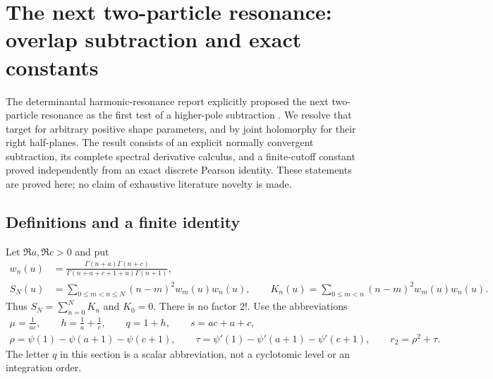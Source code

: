 \section{The next two-particle resonance: overlap subtraction and exact constants}
\label{sec:second-resonance}

The determinantal harmonic-resonance report explicitly proposed the next
two-particle resonance as the first test of a higher-pole subtraction
\cite[Section~9]{incoming-determinantal}. We resolve that target for arbitrary positive
shape parameters, and by joint holomorphy for their right half-planes.
The result consists of an explicit normally convergent subtraction, its
complete spectral derivative calculus, and a finite-cutoff constant proved
independently from an exact discrete Pearson identity. These statements
are proved here; no claim of exhaustive literature novelty is made.

\subsection{Definitions and a finite identity}
Let $\Re a,\Re c>0$ and put
\begin{align}
 w_n(u)&=\frac{\Gamma(n+a)\Gamma(n+c)}
 {\Gamma(n+a+c+1+u)\Gamma(n+1)},\label{sr:eq:weight}\\
 S_N(u)&=\sum_{0\le m<n\le N}(n-m)^2w_m(u)w_n(u),\qquad
 K_n(u)=\sum_{0\le m<n}(n-m)^2w_m(u)w_n(u).
 \label{sr:eq:cutoff}
\end{align}
Thus $S_N=\sum_{n=0}^N K_n$ and $K_0=0$. There is no factor $2!$.
Use the abbreviations
\begin{gather}
 \mu=\frac1{ac},\qquad h=\frac1a+\frac1c,\qquad q=1+h,
 \qquad s=ac+a+c,\label{sr:eq:abbreviations}\\
 \rho=\psi(1)-\psi(a+1)-\psi(c+1),\qquad
 \tau=\psi'(1)-\psi'(a+1)-\psi'(c+1),\qquad r_2=\rho^2+\tau.
 \label{sr:eq:rho}
\end{gather}
The letter $q$ in this section is a scalar abbreviation, not a
cyclotomic level or an integration order.

